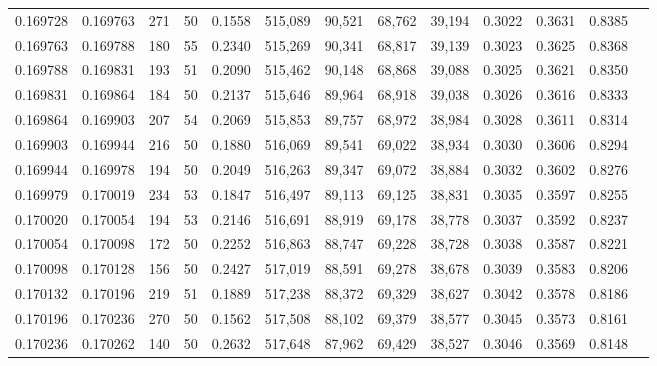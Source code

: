 \begin{tabular}{rrrrrrrrrrrrr}
0.169728 & 0.169763 &   271 &  50 &                                     0.1558 & 515,089 &  90,521 &  68,762 &  39,194 & 0.3022 & 0.3631 & 0.8385 \\
0.169763 & 0.169788 &   180 &  55 &                                     0.2340 & 515,269 &  90,341 &  68,817 &  39,139 & 0.3023 & 0.3625 & 0.8368 \\
0.169788 & 0.169831 &   193 &  51 &                                     0.2090 & 515,462 &  90,148 &  68,868 &  39,088 & 0.3025 & 0.3621 & 0.8350 \\
0.169831 & 0.169864 &   184 &  50 &                                     0.2137 & 515,646 &  89,964 &  68,918 &  39,038 & 0.3026 & 0.3616 & 0.8333 \\
0.169864 & 0.169903 &   207 &  54 &                                     0.2069 & 515,853 &  89,757 &  68,972 &  38,984 & 0.3028 & 0.3611 & 0.8314 \\
0.169903 & 0.169944 &   216 &  50 &                                     0.1880 & 516,069 &  89,541 &  69,022 &  38,934 & 0.3030 & 0.3606 & 0.8294 \\
0.169944 & 0.169978 &   194 &  50 &                                     0.2049 & 516,263 &  89,347 &  69,072 &  38,884 & 0.3032 & 0.3602 & 0.8276 \\
0.169979 & 0.170019 &   234 &  53 &                                     0.1847 & 516,497 &  89,113 &  69,125 &  38,831 & 0.3035 & 0.3597 & 0.8255 \\
0.170020 & 0.170054 &   194 &  53 &                                     0.2146 & 516,691 &  88,919 &  69,178 &  38,778 & 0.3037 & 0.3592 & 0.8237 \\
0.170054 & 0.170098 &   172 &  50 &                                     0.2252 & 516,863 &  88,747 &  69,228 &  38,728 & 0.3038 & 0.3587 & 0.8221 \\
0.170098 & 0.170128 &   156 &  50 &                                     0.2427 & 517,019 &  88,591 &  69,278 &  38,678 & 0.3039 & 0.3583 & 0.8206 \\
0.170132 & 0.170196 &   219 &  51 &                                     0.1889 & 517,238 &  88,372 &  69,329 &  38,627 & 0.3042 & 0.3578 & 0.8186 \\
0.170196 & 0.170236 &   270 &  50 &                                     0.1562 & 517,508 &  88,102 &  69,379 &  38,577 & 0.3045 & 0.3573 & 0.8161 \\
0.170236 & 0.170262 &   140 &  50 &                                     0.2632 & 517,648 &  87,962 &  69,429 &  38,527 & 0.3046 & 0.3569 & 0.8148 \\

\end{tabular}
